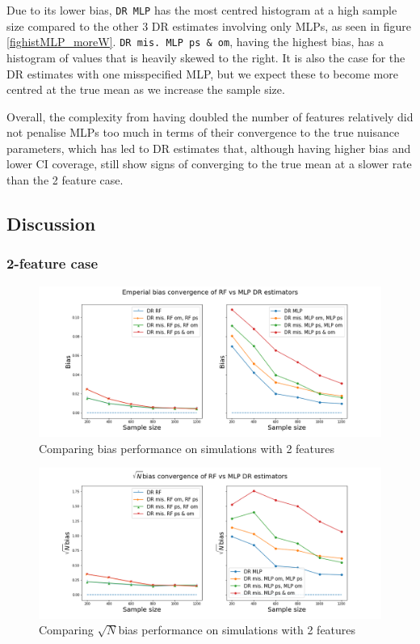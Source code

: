 \documentclass[12pt,twoside]{article}
\begin{document}
Due to its lower bias, \texttt{DR MLP} has the most centred histogram at a high sample size compared to the other 3 DR estimates involving only MLPs, as seen in figure \ref{fighistMLP_moreW}. \texttt{DR mis. MLP ps \& om}, having the highest bias, has a histogram of values that is heavily skewed to the right. It is also the case for the DR estimates with one misspecified MLP, but we expect these to become more centred at the true mean as we increase the sample size.

Overall, the complexity from having doubled the number of features relatively did not penalise MLPs too much in terms of their convergence to the true nuisance parameters, which has led to DR estimates that, although having higher bias and lower CI coverage, still show signs of converging to the true mean at a slower rate than the 2 feature case.
\clearpage
\subsection{Discussion}

\subsubsection{2-feature case} \label{2 features}

\begin{figure}[h!]
    \centering
    \includegraphics[width = 0.9\columnwidth]{figures/biascompare.png}
    \caption{Comparing bias performance on simulations with 2 features}
    \label{biascompare}
\end{figure}

\begin{figure}[h!]
    \centering
    \includegraphics[width = 0.9\columnwidth]{figures/sqrtncompare.png}
    \caption{Comparing $\sqrt{N}$bias performance on simulations with 2 features}
    \label{sqrtncompare}
\end{figure}
\end{document}
